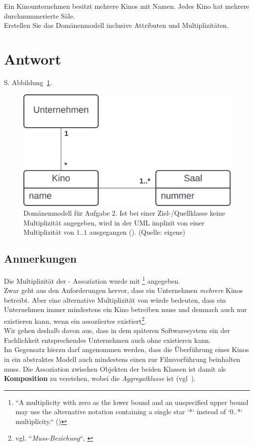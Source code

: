 Ein Kinounternehmen besitzt mehrere Kinos mit Namen.
Jedes Kino hat mehrere durchnummerierte Säle.\\
Erstellen Sie das Domänenmodell inclusive Attributen und Multiplizitäten.


\section*{Antwort}

S. Abbildung~\ref{fig:kino}.\\

\begin{figure}
    \centering
    \includegraphics[scale=0.5]{chapters/aufgabe 2/img/kino}
    \caption{Domänenmodell für Aufgabe 2. Ist bei einer Ziel-/Quellklasse keine Multiplizität angegeben, wird in der UML implizit von einer Multiplizität von $1..1$ ausgegangen (\cite[19]{UML17}). (Quelle: eigene)}
    \label{fig:kino}
\end{figure}

\subsection*{Anmerkungen}
Die Multiplizität der  -  Assoziation wurde mit \code{*}\footnote{
    ``A multiplicity with zero as the lower bound and an unspecified upper bound may use the alternative notation containing a single star `*` instead of `0..*`
    multiplicity.`` (\cite[35]{UML17})
} angegeben.\\
Zwar geht aus den Anforderungen hervor, dass ein Unternehmen \textit{mehrere} Kinos betreibt.
Aber eine alternative Multiplizität von  würde bedeuten, dass ein Unternehmen immer mindestens ein Kino betreiben muss und demnach auch nur existieren kann, wenn ein assoziiertes  existiert\footnote{
    vgl. ``\textit{Muss-Beziehung}``, \cite[166 ff.]{Bal05}
}.\\
Wir gehen deshalb davon aus, dass in dem späteren Softwaresystem ein der Fachlichkeit entsprechendes Unternehmen auch ohne  existieren kann.\\
Im Gegensatz hierzu darf angenommen werden, dass die Überführung eines Kinos in ein abstraktes Modell auch mindestens einen  zur Filmvorführung beinhalten muss.
Die Assoziation zwischen Objekten der beiden Klassen ist damit als \textbf{Komposition} zu verstehen, wobei  die \textit{Aggregatklasse} ist (vgl~\cite[49 f.]{Bal05}).

